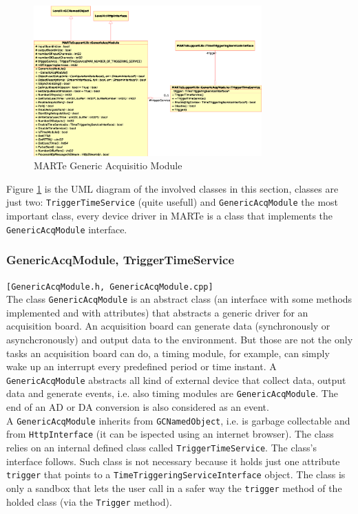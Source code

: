 \begin{figure}[h!]
 \begin{center}
  \includegraphics[width=0.78\textwidth]{MARTe/MARTe-GAcqM.eps}
  \caption{MARTe Generic Acquisitio Module}
  \label{f:MARTe:GAcqM}
 \end{center}
\end{figure}

Figure \ref{f:MARTe:GAcqM} is the UML diagram of the involved classes in this section, classes are just two: \texttt{TriggerTimeService} (quite usefull) and \texttt{GenericAcqModule} the most important class, every device driver in MARTe is a class that implements the \texttt{GenericAcqModule} interface.



\subsubsection{GenericAcqModule, TriggerTimeService}
\texttt{[GenericAcqModule.h, GenericAcqModule.cpp]} \\
The class \texttt{GenericAcqModule} is an abstract class (an interface with some methods implemented and with attributes) that abstracts a generic driver for an acquisition board. An acquisition board can generate data (synchronously or asynchcronously) and output data to the environment. But those are not the only tasks an acquisition board can do, a timing module, for example, can simply wake up an interrupt every predefined period or time instant. A \texttt{GenericAcqModule} abstracts all kind of external device that collect data, output data and generate events, i.e. also timing modules are \texttt{GenericAcqModule}. The end of an AD or DA conversion is also considered as an event. \\


A \texttt{GenericAcqModule} inherits from \texttt{GCNamedObject}, i.e. is garbage collectable and from \texttt{HttpInterface} (it can be ispected using an internet browser). The class relies on an internal defined class called \texttt{TriggerTimeService}. The class's interface follows. Such class is not necessary because it holds just one attribute \texttt{trigger} that points to a \texttt{TimeTriggeringServiceInterface} object. The class is only a sandbox that lets the user call in a safer way the \texttt{trigger} method of the holded class (via the \texttt{Trigger} method).

